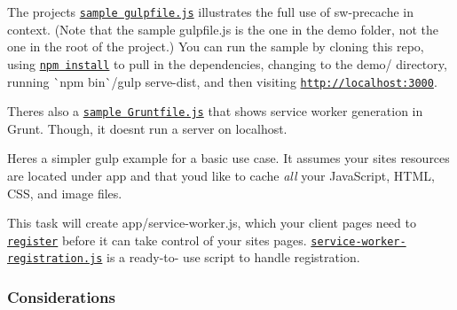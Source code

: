 The project\textquotesingle{}s \href{/demo/gulpfile.js}{\tt sample {\ttfamily gulpfile.\+js}} illustrates the full use of sw-\/precache in context. (Note that the sample gulpfile.\+js is the one in the {\ttfamily demo} folder, not the one in the root of the project.) You can run the sample by cloning this repo, using \href{https://docs.npmjs.com/}{\tt {\ttfamily npm install}} to pull in the dependencies, changing to the {\ttfamily demo/} directory, running {\ttfamily \`{}npm bin\`{}/gulp serve-\/dist}, and then visiting \href{http://localhost:3000}{\tt http\+://localhost\+:3000}.

There\textquotesingle{}s also a \href{/demo/Gruntfile.js}{\tt sample {\ttfamily Gruntfile.\+js}} that shows service worker generation in Grunt. Though, it doesn\textquotesingle{}t run a server on localhost.

Here\textquotesingle{}s a simpler gulp example for a basic use case. It assumes your site\textquotesingle{}s resources are located under {\ttfamily app} and that you\textquotesingle{}d like to cache {\itshape all} your Java\+Script, H\+T\+ML, C\+SS, and image files.




This task will create {\ttfamily app/service-\/worker.\+js}, which your client pages need to \href{https://slightlyoff.github.io/ServiceWorker/spec/service_worker/#navigator-service-worker-register}{\tt register} before it can take control of your site\textquotesingle{}s pages. \href{/demo/app/js/service-worker-registration.js}{\tt {\ttfamily service-\/worker-\/registration.\+js}} is a ready-\/to-\/ use script to handle registration.

\subsubsection*{Considerations}


